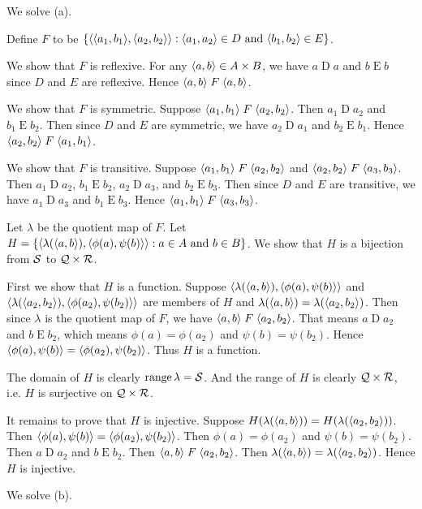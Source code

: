 \documentclass{report}
\renewcommand*{\land}{\text{ and }}
\begin{document}
\begin{solution}
We solve (a).

Define $F$ to be $\setb{\aprn{\aprn{a_1,b_1},\aprn{a_2,b_2}}}{\aprn{a_1,a_2}\in D\land \aprn{b_1,b_2}\in E}$.

We show that $F$ is reflexive. For any $\left\langle a,b\right\rangle\in A\times B$, we have $a\mathrel D a$ and $b\mathrel E b$
since $D$ and $E$ are reflexive. Hence $\left\langle a,b\right\rangle\mathrel F \left\langle a,b\right\rangle$.

We show that $F$ is symmetric. Suppose
$\left\langle a_1,b_1\right\rangle\mathrel F \left\langle a_2,b_2\right\rangle$. Then $a_1\mathrel D a_2$ and $b_1\mathrel E b_2$.
Then since $D$ and $E$ are symmetric, we have $a_2\mathrel D a_1$ and $b_2\mathrel E b_1$.
Hence $\left\langle a_2,b_2\right\rangle\mathrel F \left\langle a_1,b_1\right\rangle$.

We show that $F$ is transitive. Suppose
$\left\langle a_1,b_1\right\rangle\mathrel F \left\langle a_2,b_2\right\rangle$ and $\left\langle a_2,b_2\right\rangle\mathrel F \left\langle a_3,b_3\right\rangle$.
Then $a_1\mathrel D a_2$, $b_1\mathrel E b_2$, $a_2\mathrel D a_3$, and $b_2\mathrel E b_3$.
Then since $D$ and $E$ are transitive, we have $a_1\mathrel D a_3$ and $b_1\mathrel E b_3$.
Hence $\left\langle a_1,b_1\right\rangle\mathrel F \left\langle a_3,b_3\right\rangle$.

Let $\lambda$ be the quotient map of $F$.
Let $H=\setb{\aprn{\lambda(\aprn{a,b}),\aprn{\phi(a),\psi(b)}}}{a\in A\land b\in B}$.
We show that $H$ is a bijection
from $\mathcal{S}$ to $\mathcal{Q}\times \mathcal{R}$.

First we show that $H$ is a function. Suppose $\left\langle\lambda(\left\langle a,b\right\rangle),\left\langle\phi(a),\psi(b)\right\rangle\right\rangle$ and
$\left\langle\lambda(\left\langle a_2,b_2\right\rangle),\left\langle\phi(a_2),\psi(b_2)\right\rangle\right\rangle$ are members of $H$ and $\lambda(\left\langle a,b\right\rangle)=\lambda(\left\langle a_2,b_2\right\rangle)$.
Then since $\lambda$ is the quotient map of $F$, we have $\left\langle a,b\right\rangle\mathrel F \left\langle a_2,b_2\right\rangle$.
That means $a\mathrel D a_2$ and $b\mathrel E b_2$, which means $\phi(a)=\phi(a_2)$ and $\psi(b)=\psi(b_2)$.
Hence $\left\langle\phi(a),\psi(b)\right\rangle=\left\langle\phi(a_2),\psi(b_2)\right\rangle$. Thus $H$ is a function.

The domain of $H$ is clearly $\operatorname{range}\lambda=\mathcal{S}$. And the range of $H$ is clearly $\mathcal{Q}\times \mathcal{R}$, i.e.
$H$ is surjective on $\mathcal{Q}\times \mathcal{R}$.

It remains to prove that $H$ is injective.
Suppose $H(\lambda(\left\langle a,b\right\rangle))=H(\lambda(\left\langle a_2,b_2\right\rangle))$.
Then $\left\langle\phi(a),\psi(b)\right\rangle=\left\langle\phi(a_2),\psi(b_2)\right\rangle$.
Then $\phi(a)=\phi(a_2)$ and $\psi(b)=\psi(b_2)$.
Then $a\mathrel D a_2$ and $b\mathrel E b_2$.
Then $\left\langle a,b\right\rangle\mathrel F \left\langle a_2,b_2\right\rangle$.
Then $\lambda(\left\langle a,b\right\rangle)=\lambda(\left\langle a_2,b_2\right\rangle)$. Hence $H$ is injective.

We solve (b).
\end{solution}
\end{document}
